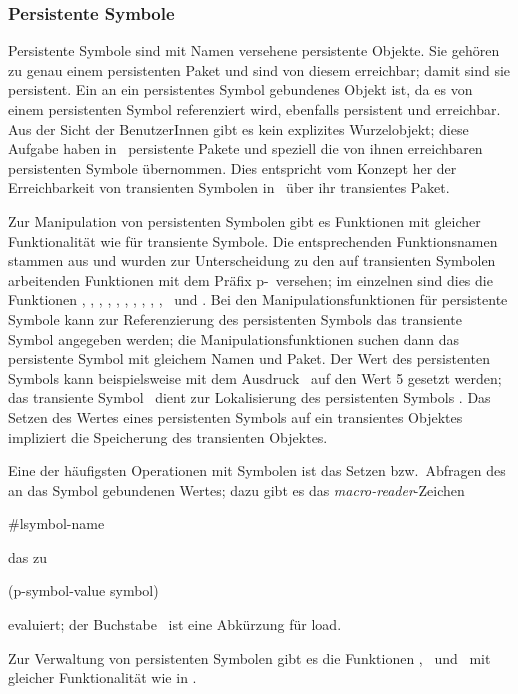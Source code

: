 \subsubsection{Persistente Symbole}
%
Persistente Symbole sind mit Namen versehene persistente Objekte. Sie
geh\"{o}ren zu genau einem persistenten Paket und sind von diesem
erreichbar; damit sind sie persistent. Ein an ein persistentes Symbol
gebundenes Objekt ist, da
es von einem persistenten Symbol referenziert wird, ebenfalls
persistent und erreichbar. Aus der Sicht der BenutzerInnen gibt es
kein explizites Wurzelobjekt; diese Aufgabe haben in
\plob\ persistente Pakete und speziell die von ihnen erreichbaren
persistenten Symbole \"{u}bernommen. Dies entspricht vom Konzept her der
Erreichbarkeit von transienten Symbolen in \cl\ \"{u}ber ihr transientes
Paket.
%
\par{}Zur Manipulation von persistenten Symbolen gibt es Funktionen
mit gleicher Funktionalit\"{a}t wie f\"{u}r transiente Symbole. Die
entsprechenden Funktionsnamen stammen aus \cite{bib:st90} und wurden
zur Unterscheidung zu den auf transienten Symbolen arbeitenden
Funktionen mit dem Pr\"{a}fix \rglq{}p-\rgrq\ versehen; im einzelnen sind
dies die Funktionen , ,
, ,
, , 
, , 
, ,
\ und .
Bei den Manipulationsfunktionen f\"{u}r persistente Symbole kann
zur Referenzierung des persistenten Symbols das transiente
Symbol angegeben werden; die Manipulationsfunktionen suchen dann
das persistente Symbol mit gleichem Namen und Paket. Der Wert des
persistenten Symbols  kann beispielsweise mit dem Ausdruck
\ auf den Wert 5 gesetzt werden;
das transiente Symbol \ dient zur Lokalisierung des
persistenten Symbols . Das Setzen des Wertes eines
persistenten Symbols auf ein transientes Objektes impliziert die
Speicherung des transienten Objektes.
%
\par{}Eine der h\"{a}ufigsten Operationen mit Symbolen ist das Setzen
bzw.\ Abfragen des an das Symbol gebundenen Wertes; dazu gibt es das
{\em macro-reader\/}-Zeichen%
%
\begin{listing}[\tt]%
\#l{\rm\lt{}symbol-name\gt{}\/}
\end{listing}%
%
\noindent das zu
%
\begin{listing}[\tt]%
(p-symbol-value {\rm\lt{}symbol\gt\/})
\end{listing}%
%
\noindent evaluiert; der Buchstabe \ ist eine Abk\"{u}rzung f\"{u}r
\rglq{}load\rgrq.
%
\par{}Zur Verwaltung von persistenten Symbolen gibt es die
Funktionen , \ und
\ mit gleicher Funktionalit\"{a}t wie in
\cite{bib:st90}.
%
%
%
